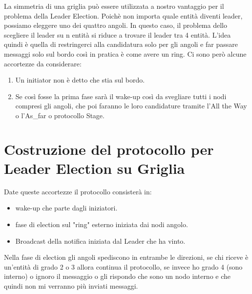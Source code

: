 La simmetria di una griglia può essere utilizzata a nostro vantaggio per il
problema della Leader Election. Poichè non importa quale entità diventi leader,
possiamo eleggere uno dei quattro angoli. In questo caso, il problema dello
scegliere il leader su n entità si riduce a trovare il leader tra 4 entità.
L'idea quindi è quella di restringerci alla candidatura solo per gli angoli e
far passare messaggi solo sul bordo così in pratica è come avere un ring. Ci
sono però alcune accortezze da considerare:
\begin{enumerate}
    \item Un initiator non è detto che stia sul bordo.
    \item Se così fosse la prima fase sarà il wake-up così da svegliare tutti i
          nodi compresi gli angoli, che poi faranno le loro candidature tramite l'All
          the Way o l'As\_far o protocollo Stage.
\end{enumerate}
\section{Costruzione del protocollo per Leader Election su Griglia}
Date queste accortezze il protocollo consisterà in:
\begin{itemize}
    \item wake-up che parte dagli iniziatori.
    \item fase di election sul "ring" esterno iniziata dai nodi angolo.
    \item Broadcast della notifica iniziata dal Leader che ha vinto.
\end{itemize}
Nella fase di election gli angoli spediscono in entrambe le direzioni, se chi
riceve è un'entità di grado 2 o 3 allora continua il protocollo, se invece ho
grado 4 (sono interno) o ignoro il messaggio o gli rispondo che sono un nodo
interno e che quindi non mi verranno più inviati messaggi.\\
